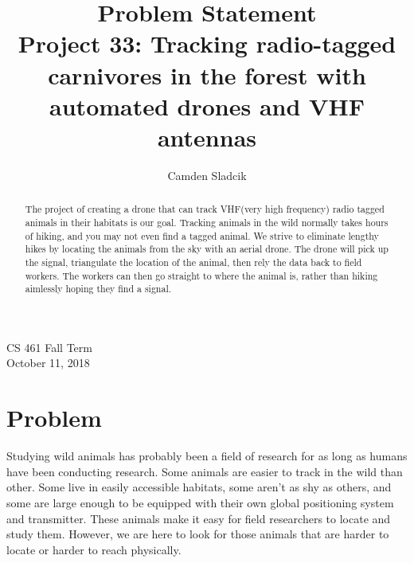\documentclass[10pt, draftclsnofoot, onecolumn] {IEEEtran}
\begin{document}
\title{\textbf{Problem Statement}{ \\ 
                \large Project 33: Tracking radio-tagged carnivores
                in the forest with automated drones
                and VHF antennas}}

\author{Camden Sladcik}


\begin{titlepage}
    \maketitle
    
    \begin{center}
        
        CS 461 Fall Term \\
        October 11, 2018
        
    \end{center}
    \begin{abstract}
     	The project of creating a drone that can track VHF(very high frequency) radio tagged animals in their habitats is our goal. Tracking animals in the wild normally takes hours of hiking, and you may not even find a tagged animal. We strive to eliminate lengthy hikes by locating the animals from the sky with an aerial drone. The drone will pick up the signal, triangulate the location of the animal, then rely the data back to field workers. The workers can then go straight to where the animal is, rather than hiking aimlessly hoping they find a signal. 
    \end{abstract}  
    \end{titlepage}


\section{Problem}
    Studying wild animals has probably been a field of research for as long as humans have been conducting research. 
    Some animals are easier to track in the wild than other. Some live in easily accessible habitats, some aren't as shy as others, and some are large enough to be equipped with their own global positioning system and transmitter. These animals make it easy for field researchers to locate and study them. However, we are here to look for those animals that are harder to locate or harder to reach physically.
\end{document}
